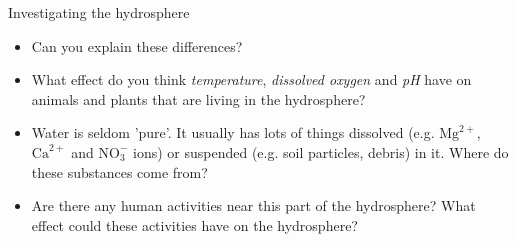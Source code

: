 \begin{Investigation}{Investigating the hydrosphere
      }
\begin{itemize}[noitemsep]
\label{m38138*uid11}\item Can you explain these differences?
\label{m38138*uid12}\item What effect do you think \textsl{temperature}, \textsl{dissolved oxygen} and \textsl{pH} have on animals and plants that are living in the hydrosphere?
\label{m38138*uid13}\item Water is seldom 'pure'. It usually has lots of things dissolved (e.g. ${\text{Mg}}^{2+}$, ${\text{Ca}}^{2+}$ and $\text{NO}_{3}^{-}$ ions) or suspended (e.g. soil particles, debris) in it. Where do these substances come from?
\label{m38138*uid14}\item Are there any human activities near this part of the hydrosphere? What effect could these activities have on the hydrosphere?
\end{itemize}
\end{Investigation}
